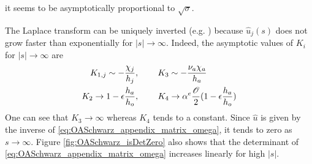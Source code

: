 it seems to be asymptotically proportional to $\sqrt{\sigma}$.
\par
The Laplace transform can be uniquely inverted
(e.g. \citep{cohen_inversion_2007}) because
$\widehat{u}_j(s)$ does not grow faster than exponentially
for $|s|\rightarrow \infty$.
Indeed, the asymptotic values of $K_i$ for $|s|\to\infty$ are
\begin{equation*}
	\begin{aligned}
		K_{1,j} \sim -\frac{\chi_j}{h_j}, ~~~~~~~&
		K_{3} \sim -\frac{\nu_a \chi_a}{h_a}\\
		K_{2} \rightarrow 1 - \epsilon \frac{h_a}{h_o},
		~~~~~~~&
		K_{4} \rightarrow \alpha^e
		\frac{\cal O}{2}(1 - \epsilon \frac{h_a}{h_o})
	\end{aligned}
\end{equation*}
One can see that $K_3 \rightarrow \infty$ whereas $K_4$ tends to
a constant. Since $\widehat{u}$ is given by the inverse of
\eqref{eq:OASchwarz_appendix_matrix_omega}, it tends to zero as
$s\rightarrow \infty$.
Figure \ref{fig:OASchwarz_isDetZero} also
shows that the determinant of
\eqref{eq:OASchwarz_appendix_matrix_omega} increases linearly for
high $|s|$.
